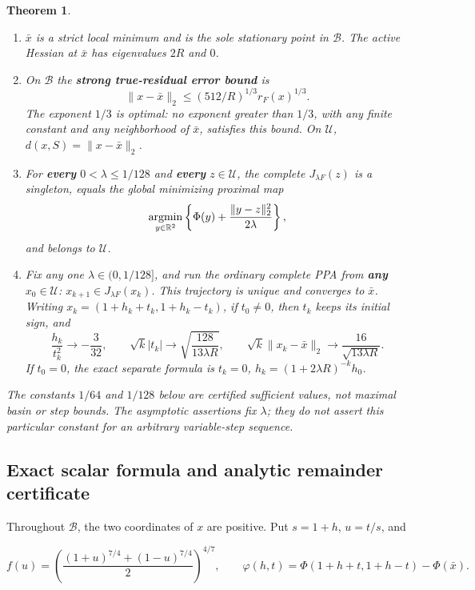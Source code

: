 \documentclass[11pt]{article}
\newtheorem{theorem}{Theorem}[section]
\theoremstyle{remark}\newtheorem{remark}[theorem]{Remark}
\begin{document}
\begin{theorem}
\begin{enumerate}
\item \(\bar x\) is a strict local minimum and is the sole stationary point in \(\mathcal B\). The active Hessian at \(\bar x\) has eigenvalues \(2R\) and \(0\).
\item On \(\mathcal B\) the \textbf{strong true-residual error bound} is
   \[
   \|x-\bar x\|_2\le (512/R)^{1/3}r_F(x)^{1/3}.
   \]
   The exponent \(1/3\) is optimal: no exponent greater than \(1/3\), with any finite constant and any neighborhood of \(\bar x\), satisfies this bound. On \(\mathcal U\), \(d(x,S)=\|x-\bar x\|_2\).
\item For \textbf{every} \(0<\lambda\le 1/128\) and \textbf{every} \(z\in\mathcal U\), the complete \(J_{\lambda F}(z)\) is a singleton, equals the global minimizing proximal map
   \[
   \mathop{\rm argmin}_{y\in\mathbb R^2}
   \left\{\Phi(y)+\frac{\|y-z\|_2^2}{2\lambda}\right\},
   \]
   and belongs to \(\mathcal U\).
\item Fix any one \(\lambda\in(0,1/128]\), and run the ordinary complete PPA from \textbf{any} \(x_0\in\mathcal U\): \(x_{k+1}\in J_{\lambda F}(x_k)\). This trajectory is unique and converges to \(\bar x\). Writing \(x_k=(1+h_k+t_k,1+h_k-t_k)\), if \(t_0\ne0\), then \(t_k\) keeps its initial sign, and
   \[
   \frac{h_k}{t_k^2}\longrightarrow-\frac3{32},\qquad
   \sqrt{k}|t_k|\longrightarrow\sqrt{\frac{128}{13\lambda R}},\qquad
   \boxed{\sqrt{k}\|x_k-\bar x\|_2\longrightarrow
   \frac{16}{\sqrt{13\lambda R}}.}
   \]
   If \(t_0=0\), the exact separate formula is \(t_k=0\), \(h_k=(1+2\lambda R)^{-k}h_0\).

\end{enumerate}

The constants \(1/64\) and \(1/128\) below are certified sufficient values, not maximal basin or step bounds. The asymptotic assertions fix \(\lambda\); they do not assert this particular constant for an arbitrary variable-step sequence.

\end{theorem}
\subsection{Exact scalar formula and analytic remainder certificate}

Throughout \(\mathcal B\), the two coordinates of \(x\) are positive. Put \(s=1+h\), \(u=t/s\), and

\[
f(u)=\left(\frac{(1+u)^{7/4}+(1-u)^{7/4}}2\right)^{4/7},\qquad
\varphi(h,t)=\Phi(1+h+t,1+h-t)-\Phi(\bar x).
\]
\end{document}
